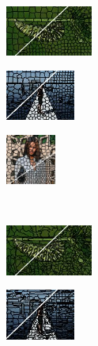 \begin{figure}
\begin{subfigure}[b]{0.02\textwidth}
	\end{subfigure}
	\begin{subfigure}[b]{0.16\textwidth}
		\includegraphics[height=1.65cm]{pictures/bsds500/slic/cropped/slic_35028_contours}
	\end{subfigure}
	\begin{subfigure}[b]{0.129\textwidth}
		\includegraphics[height=1.65cm]{pictures/sbd/slic/cropped/slic_0004774_contours}
	\end{subfigure}
	\begin{subfigure}[b]{0.10\textwidth}
		\includegraphics[height=1.65cm]{pictures/fash/slic/cropped/slic_010_contours}
	\end{subfigure}\\
	\begin{subfigure}[b]{0.02\textwidth}
	\end{subfigure}
	\begin{subfigure}[b]{0.16\textwidth}
		\includegraphics[height=1.65cm]{pictures/bsds500/crs/cropped/crs_35028_contours}
	\end{subfigure}
	\begin{subfigure}[b]{0.129\textwidth}
		\includegraphics[height=1.65cm]{pictures/sbd/crs/cropped/crs_0004774_contours}
	\end{subfigure}
	\begin{subfigure}[b]{0.10\textwidth}

\end{subfigure}
\end{figure}
